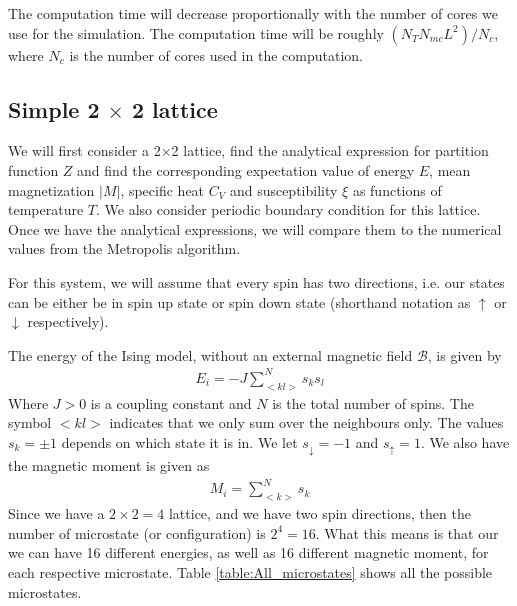 \documentclass[12pt]{article}
\begin{document}
The computation time will decrease proportionally with the number of cores we use for the simulation. The computation time will be roughly $(N_TN_{mc}L^2)/N_{c}$, where $N_{c}$ is the number of cores used in the computation.
\subsection{Simple 2 $\times$ 2 lattice}
We will first consider a 2$\times$2 lattice, find the analytical expression for partition function $Z$ and find the corresponding expectation value of energy $E$, mean magnetization $|M|$, specific heat $C_V$ and susceptibility $\xi$ as functions of temperature $T$. We also consider periodic boundary condition for this lattice. Once we have the analytical expressions, we will compare them to the numerical values from the Metropolis algorithm.

For this system, we will assume that every spin has two directions, i.e. our states can be either be in spin up state or spin down state (shorthand notation as $\uparrow$ or $\downarrow$ respectively).

The energy of the Ising model, without an external magnetic field $\mathcal{B}$, is given by
\begin{align*}
E_i = \displaystyle -J \sum_{<kl>}^Ns_k s_l
\end{align*} 
Where $J > 0$ is a coupling constant and $N$ is the total number of spins. The symbol $<kl>$ indicates that we only sum over the neighbours only. The values $s_k = \pm 1$ depends on which state it is in. We let $s_{\downarrow} = -1$ and $s_{\uparrow} = 1$. We also have the magnetic moment is given as
\begin{align*}
M_i = \displaystyle \sum_{<k>}^N s_k
\end{align*}
Since we have a $2\times2=4$ lattice, and we have two spin directions, then the number of microstate (or configuration) is $2^4 = 16$. What this means is that our we can have 16 different energies, as well as 16 different magnetic moment, for each respective microstate. Table \ref{table:All_microstates} shows all the possible microstates.
\end{document}
